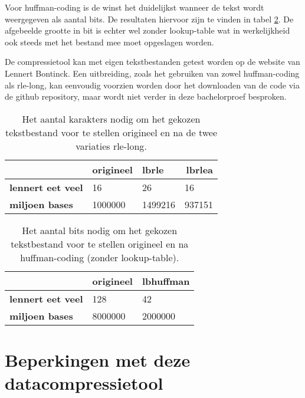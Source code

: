 Voor \gls{huffman-coding} is de winst het duidelijkst wanneer de tekst wordt weergegeven als aantal \glspl{bit}. De resultaten hiervoor zijn te vinden in tabel \ref{tab:compressietool-winst-huffman}. De afgebeelde grootte in \gls{bit} is echter wel zonder \gls{lookup-table} wat in werkelijkheid ook steeds met het bestand mee moet opgeslagen worden.

De \gls{compressietool} kan met eigen tekstbestanden getest worden op de website van Lennert Bontinck. Een uitbreiding, zoals het gebruiken van zowel \gls{huffman-coding} als \gls{rle-long}, kan eenvoudig voorzien worden door het downloaden van de code via de \gls{github} repository, maar wordt niet verder in deze bachelorproef besproken.

\begin{table}[h]
	\begin{tabular}{|l|l|l|l|}
		\hline
		& \textbf{origineel} & \textbf{lbrle} & \multicolumn{1}{r|}{\textbf{lbrlea}} \\ \hline
		\textbf{lennert eet veel} & 16                 & 26             & 16                                   \\ \hline
		\textbf{miljoen bases}    & 1000000            & 1499216        & 937151                               \\ \hline
	\end{tabular}
	\caption{Het aantal karakters nodig om het gekozen tekstbestand voor te stellen origineel en na de twee variaties \gls{rle-long}.}
	\label{tab:compressietool-winst-rle}
\end{table}

\begin{table}[h]
	\begin{tabular}{|l|l|l|}
		\hline
		& \textbf{origineel} & \textbf{lbhuffman} \\ \hline
		\textbf{lennert eet veel} & 128                & 42                 \\ \hline
		\textbf{miljoen bases}    & 8000000            & 2000000            \\ \hline
	\end{tabular}
	\caption{Het aantal \glspl{bit} nodig om het gekozen tekstbestand voor te stellen origineel en na \gls{huffman-coding} (zonder \gls{lookup-table}).}
	\label{tab:compressietool-winst-huffman}
\end{table}

\section{Beperkingen met deze datacompressietool}
\label{sec:compressietool-beperkingen}

